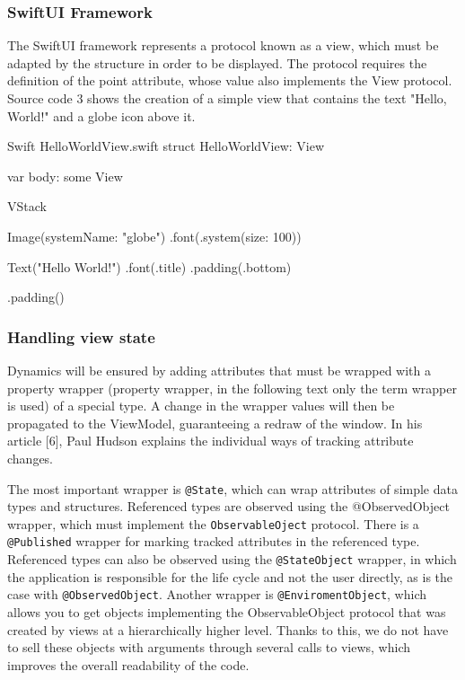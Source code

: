 \documentclass[
  biblatex = false,
  language=english,
  figures=false,
  sourcecodes,
  glossaries,
  index
]{kidiplom}
\begin{document}
\subsubsection{SwiftUI Framework}
The SwiftUI framework represents a protocol known as a view, which must be adapted by the structure in order to be displayed. The protocol requires the definition of the point attribute, whose value also implements the View protocol. Source code 3 shows the creation of a simple view that contains the text "Hello, World!" and a globe icon above it.

\begin{kicode}{Swift}{} {HelloWorldView.swift}
struct HelloWorldView: View {
    var body: some View {
        VStack {
            Image(systemName: "globe")
                .font(.system(size: 100))
                
            Text("Hello World!")
                .font(.title)
                .padding(.bottom)
        }
        .padding()
    }
}
\end{kicode}

\subsubsection{Handling view state}
Dynamics will be ensured by adding attributes that must be wrapped with a property wrapper (property wrapper, in the following text only the term wrapper is used) of a special type. A change in the wrapper values will then be propagated to the ViewModel, guaranteeing a redraw of the window. In his article [6], Paul Hudson explains the individual ways of tracking attribute changes.

The most important wrapper is \texttt{@State}, which can wrap attributes of simple data types and structures. Referenced types are observed using the @ObservedObject wrapper, which must implement the \texttt{ObservableOject} protocol. There is a \texttt{@Published} wrapper for marking tracked attributes in the referenced type. Referenced types can also be observed using the \texttt{@StateObject} wrapper, in which the application is responsible for the life cycle and not the user directly, as is the case with \texttt{@ObservedObject}. Another wrapper is \texttt{@EnviromentObject}, which allows you to get objects implementing the ObservableObject protocol that was created by views at a hierarchically higher level. Thanks to this, we do not have to sell these objects with arguments through several calls to views, which improves the overall readability of the code.
\end{document}

